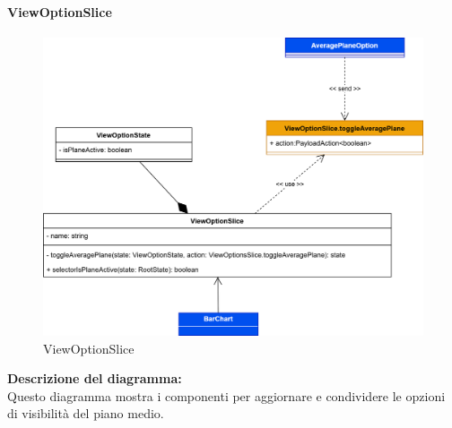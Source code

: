 \paragraph{ViewOptionSlice}
\begin{figure}[h!] \centering
    \includegraphics[scale=0.18]{template/images/uml_front/logic/ViewOptionSlice.png}
    \caption{ViewOptionSlice}
\end{figure}
\textbf{Descrizione del diagramma:}\\
Questo diagramma mostra i componenti per aggiornare e condividere le opzioni di visibilità del piano medio.
